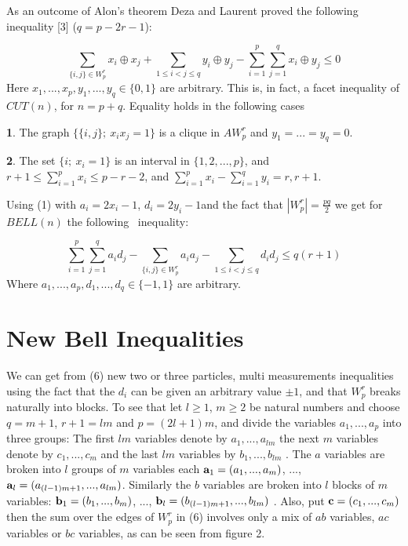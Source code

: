As an outcome of Alon's theorem Deza and Laurent proved the following
inequality [3] ($q=p-2r-1$):

\begin{equation}
\sum_{\{i,j\}\in W_{p}^{r}}x_{i}\oplus x_{j}+\sum_{1\leq i<j\leq
q}y_{i}\oplus y_{j}-\sum_{i=1}^{p}\sum_{j=1}^{q}x_{i}\oplus y_{j}\leq 0
\end{equation}
Here $x_{1},...,x_{p},y_{1},...,y_{q}\in \{0,1\}$ are arbitrary. This is, in
fact, a facet inequality of $CUT(n)$, for $n=p+q$. Equality holds in the
following cases

{\bf 1}. The graph $\{\{i,j\};\ x_{i}x_{j}=1\}$ is a clique in $AW_{p}^{r}$
and $y_{1}=...=y_{q}=0$.

{\bf 2}. The set $\{i;\ x_{i}=1\}$ is an interval in $\{1,2,...,p\}$, and $%
r+1\leq \sum_{i=1}^{p}x_{i}\leq p-r-2$, and $\sum_{i=1}^{p}x_{i}-%
\sum_{i=1}^{q}y_{i}=r,r+1$.

Using (1) with $a_{i}=2x_{i}-1$, $d_{i}=2y_{i}-1$and the fact that $\left|
W_{p}^{r}\right| =\frac{pq}{2}$ we get for $BELL(n)$ the following \
inequality:

\begin{equation}
\sum_{i=1}^{p}\sum_{j=1}^{q}a_{i}d_{j}-\sum_{\{i,j\}\in
W_{p}^{r}}a_{i}a_{j}-\sum_{1\leq i<j\leq q}d_{i}d_{j}\leq q(r+1)
\end{equation}
Where $a_{1},...,a_{p},d_{1},...,d_{q}\in \{-1,1\}$ are arbitrary.

\section{New Bell Inequalities}

We can get from (6) new two or three particles, multi measurements
inequalities using the fact that the $d_{i}$ can be given an arbitrary value
$\pm 1$, and that $W_{p}^{r}$ breaks naturally into blocks. To see that let $%
l\geq 1$, $m\geq 2$ be natural numbers and choose $q=m+1$, $r+1=lm$ and $%
p=(2l+1)m$, and divide the variables $a_{1},...,a_{p}$ into three groups:
The first $lm$ variables denote by $a_{1},...,a_{lm}$ the next $m$ variables
denote by $c_{1},...,c_{m}$ and the last $lm$ variables by $b_{1},...,b_{lm}$%
. The $a$ variables are broken into $l$ groups of $m$ variables each ${\bf a}%
_{1}=(a_{1},...,a_{m})$, ..., ${\bf a}_{l}=(a_{(l-1)m+1},...,a_{lm})$.
Similarly the $b$ variables are broken into $l$ blocks of $m$ variables: $%
{\bf b}_{1}=(b_{1},...,b_{m})$, ..., ${\bf b}_{l}=(b_{(l-1)m+1},...,b_{lm})$%
. Also, put ${\bf c}=(c_{1},...,c_{m})$ then the sum over the edges of $%
W_{p}^{r}$ in (6) involves only a mix of $ab$ variables, $ac$ variables or $%
bc$ variables, as can be seen from figure 2.

